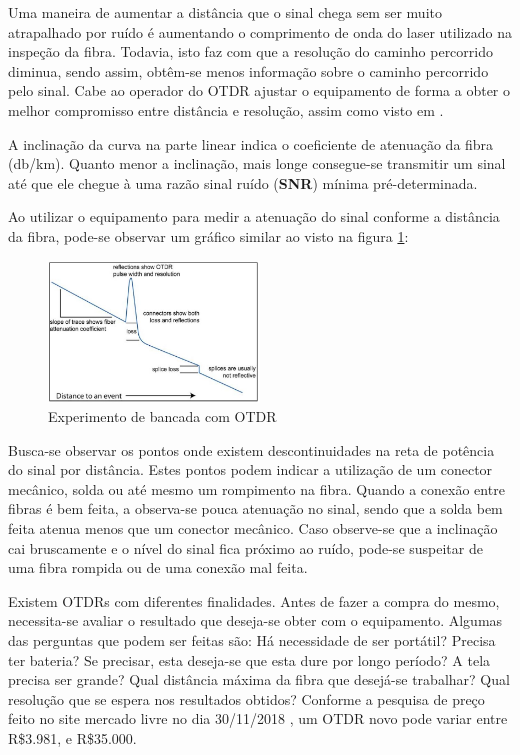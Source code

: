 \documentclass[article]{IEEEtran}
\begin{document}
Uma maneira de aumentar a distância que o sinal chega sem ser muito atrapalhado por ruído é aumentando o comprimento de onda do laser utilizado na inspeção da fibra. Todavia, isto faz com que a resolução do caminho percorrido diminua, sendo assim, obtêm-se menos informação sobre o caminho percorrido pelo sinal. Cabe ao operador do OTDR ajustar o equipamento de forma a obter o melhor compromisso entre distância e resolução, assim como visto em \cite{OTDR_LAB}.

A inclinação da curva na parte linear indica o coeficiente de atenuação da fibra (db/km). Quanto menor a inclinação, mais longe consegue-se transmitir um sinal até que ele chegue à uma razão sinal ruído (\textbf{SNR}) mínima pré-determinada.

Ao utilizar o equipamento para medir a atenuação do sinal conforme a distância da fibra, pode-se observar um gráfico similar ao visto na figura \ref{fig:OTDR_grafico}:
\begin{figure}[H]
	\includegraphics[width=0.5\textwidth]{images/OTDR_grafico.JPG}
	\caption{Experimento de bancada com OTDR}
	\label{fig:OTDR_grafico}
\end{figure} 

Busca-se observar os pontos onde existem descontinuidades na reta de potência do sinal por distância. Estes pontos podem indicar a utilização de um conector mecânico, solda ou até mesmo um rompimento na fibra. Quando a conexão entre fibras é bem feita, a observa-se pouca atenuação no sinal, sendo que a solda bem feita atenua menos que um conector mecânico. Caso observe-se que a inclinação cai bruscamente e o nível do sinal fica próximo ao ruído, pode-se suspeitar de uma fibra rompida ou de uma conexão mal feita.

Existem OTDRs com diferentes finalidades. Antes de fazer a compra do mesmo, necessita-se avaliar o resultado que deseja-se obter com o equipamento. Algumas das perguntas que podem ser feitas são: Há necessidade de ser portátil? Precisa ter bateria? Se precisar, esta deseja-se que esta dure por longo período? A tela precisa ser grande? Qual distância máxima da fibra que desejá-se trabalhar? Qual resolução que se espera nos resultados obtidos? Conforme a pesquisa de preço feito no site mercado livre no dia 30/11/2018 \cite{M_LIVRE}, um OTDR novo pode variar entre R\$3.981, e R\$35.000.
\end{document}
